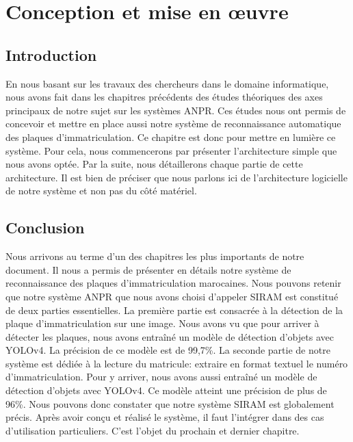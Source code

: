 \chapter{\textbf{Conception et mise en œuvre}}
    \section{Introduction}
    En nous basant sur les travaux des chercheurs dans le domaine informatique, nous avons fait dans les chapitres précédents des études théoriques des axes principaux de notre sujet sur les systèmes ANPR. Ces études nous ont permis de concevoir et mettre en place aussi notre système de reconnaissance automatique des plaques d'immatriculation. Ce chapitre est donc pour mettre en lumière ce système. Pour cela, nous commencerons par présenter l'architecture simple que nous avons optée. Par la suite, nous détaillerons chaque partie de cette architecture. Il est bien de préciser que nous parlons ici de l'architecture logicielle de notre système et non pas du côté matériel.
    
    
    
    

    \section{Conclusion}
    Nous arrivons au terme d’un des chapitres les plus importants de notre document. Il  nous a permis de présenter en détails notre système de reconnaissance des plaques d’immatriculation marocaines. Nous pouvons retenir que notre système ANPR que nous avons choisi d’appeler SIRAM est constitué de deux parties essentielles. La première partie est consacrée à la détection de la plaque d’immatriculation sur une image. Nous avons vu que pour arriver à détecter les plaques, nous avons entraîné un modèle de détection d’objets avec YOLOv4. La précision de ce modèle est de 99,7\%. La seconde partie de notre système est dédiée à la lecture du matricule: extraire en format textuel le numéro d’immatriculation. Pour y arriver, nous avons aussi entraîné un modèle de détection d’objets avec YOLOv4. Ce modèle atteint une précision de plus de 96\%. Nous pouvons donc constater que notre système SIRAM est globalement précis. Après avoir conçu et réalisé le système, il faut l’intégrer dans des cas d’utilisation particuliers. C’est l’objet du prochain et dernier chapitre.